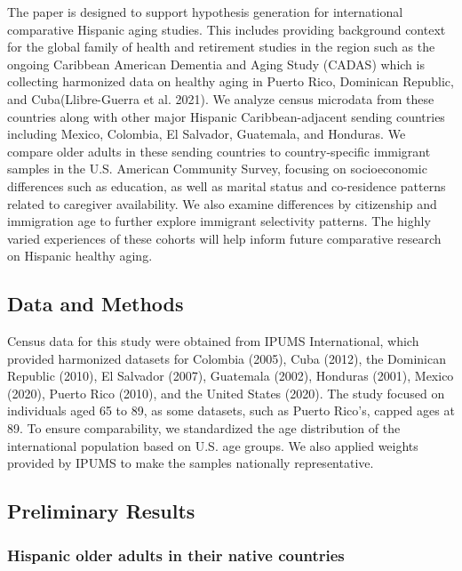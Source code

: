 \documentclass[
]{article}
\begin{document}
The paper is designed to support hypothesis generation for international
comparative Hispanic aging studies. This includes providing background
context for the global family of health and retirement studies in the
region such as the ongoing Caribbean American Dementia and Aging Study
(CADAS) which is collecting harmonized data on healthy aging in Puerto
Rico, Dominican Republic, and Cuba(Llibre-Guerra et al. 2021). We
analyze census microdata from these countries along with other major
Hispanic Caribbean-adjacent sending countries including Mexico,
Colombia, El Salvador, Guatemala, and Honduras. We compare older adults
in these sending countries to country-specific immigrant samples in the
U.S. American Community Survey, focusing on socioeconomic differences
such as education, as well as marital status and co-residence patterns
related to caregiver availability. We also examine differences by
citizenship and immigration age to further explore immigrant selectivity
patterns. The highly varied experiences of these cohorts will help
inform future comparative research on Hispanic healthy aging.

\subsection{Data and Methods}\label{data-and-methods}

Census data for this study were obtained from IPUMS International, which
provided harmonized datasets for Colombia (2005), Cuba (2012), the
Dominican Republic (2010), El Salvador (2007), Guatemala (2002),
Honduras (2001), Mexico (2020), Puerto Rico (2010), and the United
States (2020). The study focused on individuals aged 65 to 89, as some
datasets, such as Puerto Rico's, capped ages at 89. To ensure
comparability, we standardized the age distribution of the international
population based on U.S. age groups. We also applied weights provided by
IPUMS to make the samples nationally representative.

\subsection{Preliminary Results}\label{preliminary-results}

\subsubsection{Hispanic older adults in their native
countries}\label{hispanic-older-adults-in-their-native-countries}
\end{document}
